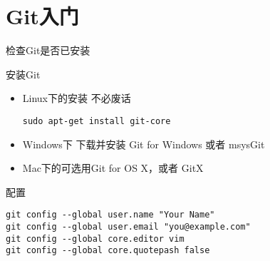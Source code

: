 \part{Git入门}

\begin{frame}[<+->][fragile]{检查Git是否已安装}
\end{frame}


\begin{frame}[<+->][fragile]{安装Git}
\begin{itemize}
  \item Linux下的安装
  不必废话
\begin{Verbatim}[frame=single,commandchars=\\\{\}]
sudo apt-get install git-core
\end{Verbatim}

  \item Windows下
  下载并安装 Git for Windows 或者 msysGit

  
  \item Mac下的可选用Git for OS X，或者 GitX
\end{itemize}
\end{frame}

\begin{frame}[<+->][fragile]{配置}
\begin{Verbatim}[frame=single,commandchars=\\\{\}]
git config --global user.name "Your Name"
git config --global user.email "you@example.com"
git config --global core.editor vim
git config --global core.quotepash false
\end{Verbatim}
\end{frame}

